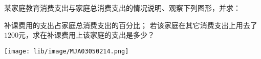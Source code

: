某家庭教育消费支出与家庭总消费支出的情况说明、观察下列图形，并求：
\begin{subquestions}
    \subquestion 补课费用的支出占家庭总消费支出的百分比；
    \subquestion 若该家庭在其它消费支出上用去了$1200$元，求在补课费用上该家庭的支出是多少？

\end{subquestions}

\begin{center}
    \texttt{[image: lib/image/MJA03050214.png]}
\end{center}
